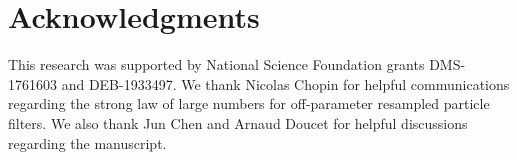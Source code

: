 \documentclass[numsec,webpdf,modern,medium,namedate]{oup-authoring-template}
\theoremstyle{thmstyleone}%
\theoremstyle{thmstyletwo}%
\theoremstyle{thmstylethree}%
\begin{document}
\section*{Acknowledgments}
This research was supported by National Science Foundation grants DMS-1761603 and DEB-1933497. 
We thank Nicolas Chopin for helpful communications regarding the strong law of large numbers for off-parameter resampled particle filters. We also thank Jun Chen and Arnaud Doucet for helpful discussions regarding the manuscript.





\end{document}
